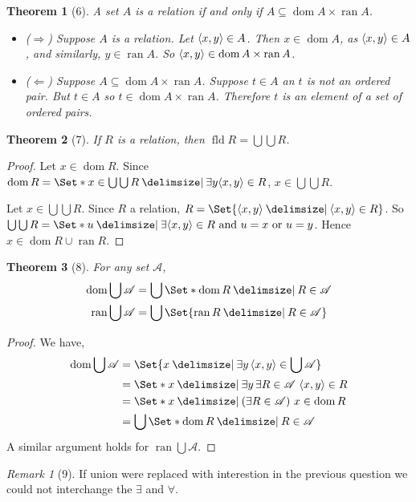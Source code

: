 \documentclass[12pt]{article}
\theoremstyle{plain}
\newtheorem*{exthm}{Theorem}
\theoremstyle{remark}
\theoremstyle{definition}
\theoremstyle{remark}
\newtheorem*{remark}{Remark}
\providecommand\st{}
\newcommand\SetSymbol[1][]{%
  \nonscript\:#1\vert%
  \allowbreak%
  \nonscript\:
\mathopen{}}
\DeclarePairedDelimiter{\ang}{\langle}{\rangle}
\renewcommand\st{\SetSymbol[\delimsize]}
\DeclareMathOperator{\dom}{dom}
\DeclareMathOperator{\ran}{ran}
\DeclareMathOperator{\fld}{fld}
\begin{document}
\begin{exthm}[6]
  A set $A$ is a relation if and only if $A \subseteq \dom{A} \times \ran{A}$.
  \begin{itemize}
    \item ($\Rightarrow$) Suppose $A$ is a relation. Let $\ang{x,y} \in A$. Then $x \in \dom{A}$, as $\ang{x,y} \in A$, and similarly, $y \in \ran{A}$. So $\ang{x,y} \in \dom{A} \times \ran{A}$.
    \item ($\Leftarrow$) Suppose $A \subseteq \dom{A} \times \ran{A}$. Suppose $t \in A$ an $t$ is not an ordered pair. But $t \in A$ so $t \in \dom{A} \times \ran{A}$. Therefore $t$ is an element of a set of ordered pairs.
  \end{itemize}
\end{exthm}
\begin{exthm}[7]
  If $R$ is a relation, then $\fld{R} = \bigcup\bigcup R$.
\end{exthm}
\begin{proof}
  Let $x \in \dom{R}$. Since $\dom{R} = \Set*{x \in \bigcup\bigcup R \st \exists y \ang{x,y} \in R}$, $x \in \bigcup\bigcup R$.

  Let $x \in \bigcup\bigcup R$. Since $R$ a relation, $R = \Set{\ang{x, y} \st \ang{x,y} \in R}$. So $\bigcup \bigcup R = \Set*{u \st \exists \ang{x,y} \in R \text{ and } u = x \text{ or } u = y}$. Hence $x \in \dom{R} \cup \ran{R}$.
\end{proof}
\begin{exthm}[8]
  For any set $\mathscr{A}$,
  \begin{align*}
    \dom{\bigcup \mathscr{A}} &= \bigcup \Set*{\dom{R} \st R \in \mathscr{A}}\\
    \ran{\bigcup \mathscr{A}} &= \bigcup \Set{\ran{R} \st R \in \mathscr{A}}
  \end{align*}
\end{exthm}
\begin{proof}
  We have,
  \begin{align*}
    \dom{\bigcup \mathscr{A}} &= \Set{x \st \exists y\, \ang{x, y} \in \bigcup \mathscr{A}}\\
                              &= \Set*{x \st \exists y\, \exists R \in \mathscr{A}\ \ang{x,y} \in R}\\
                              &= \Set*{x \st (\exists R \in \mathscr{A})\ x \in \dom{R}}\\
                              &= \bigcup \Set*{\dom{R} \st R \in \mathscr{A}}
  \end{align*}
  A similar argument holds for $\ran \bigcup \mathscr{A}$.
\end{proof}
\begin{remark}[9]
  If union were replaced with interestion in the previous question we could not interchange the $\exists$ and $\forall$.
\end{remark}
\end{document}
